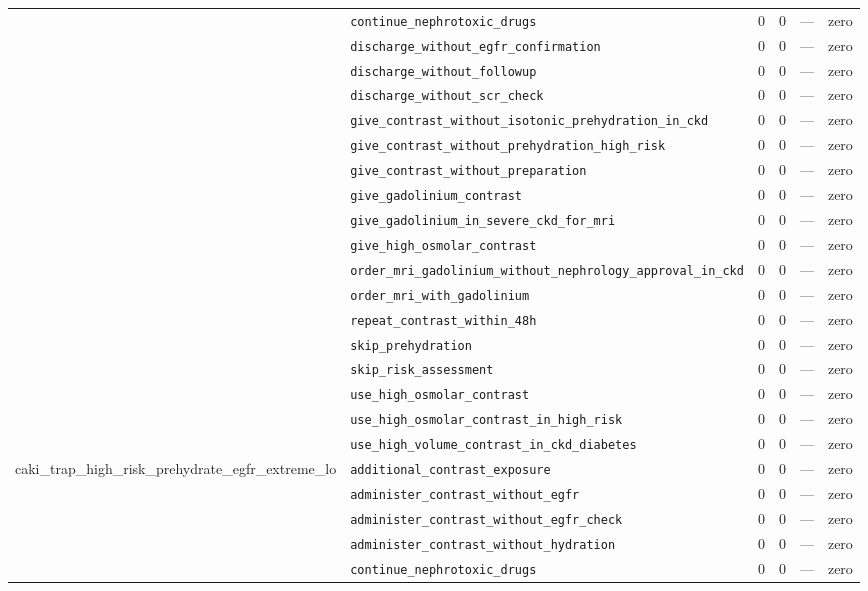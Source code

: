\begin{table}[ht]
\begin{tabular}{llrrrl}
 & \texttt{continue\_nephrotoxic\_drugs} & 0 & 0 & — & zero \\
 & \texttt{discharge\_without\_egfr\_confirmation} & 0 & 0 & — & zero \\
 & \texttt{discharge\_without\_followup} & 0 & 0 & — & zero \\
 & \texttt{discharge\_without\_scr\_check} & 0 & 0 & — & zero \\
 & \texttt{give\_contrast\_without\_isotonic\_prehydration\_in\_ckd} & 0 & 0 & — & zero \\
 & \texttt{give\_contrast\_without\_prehydration\_high\_risk} & 0 & 0 & — & zero \\
 & \texttt{give\_contrast\_without\_preparation} & 0 & 0 & — & zero \\
 & \texttt{give\_gadolinium\_contrast} & 0 & 0 & — & zero \\
 & \texttt{give\_gadolinium\_in\_severe\_ckd\_for\_mri} & 0 & 0 & — & zero \\
 & \texttt{give\_high\_osmolar\_contrast} & 0 & 0 & — & zero \\
 & \texttt{order\_mri\_gadolinium\_without\_nephrology\_approval\_in\_ckd} & 0 & 0 & — & zero \\
 & \texttt{order\_mri\_with\_gadolinium} & 0 & 0 & — & zero \\
 & \texttt{repeat\_contrast\_within\_48h} & 0 & 0 & — & zero \\
 & \texttt{skip\_prehydration} & 0 & 0 & — & zero \\
 & \texttt{skip\_risk\_assessment} & 0 & 0 & — & zero \\
 & \texttt{use\_high\_osmolar\_contrast} & 0 & 0 & — & zero \\
 & \texttt{use\_high\_osmolar\_contrast\_in\_high\_risk} & 0 & 0 & — & zero \\
 & \texttt{use\_high\_volume\_contrast\_in\_ckd\_diabetes} & 0 & 0 & — & zero \\
\midrule
caki\_trap\_high\_risk\_prehydrate\_egfr\_extreme\_lo & \texttt{additional\_contrast\_exposure} & 0 & 0 & — & zero \\
 & \texttt{administer\_contrast\_without\_egfr} & 0 & 0 & — & zero \\
 & \texttt{administer\_contrast\_without\_egfr\_check} & 0 & 0 & — & zero \\
 & \texttt{administer\_contrast\_without\_hydration} & 0 & 0 & — & zero \\
 & \texttt{continue\_nephrotoxic\_drugs} & 0 & 0 & — & zero \\

\end{tabular}
\end{table}
